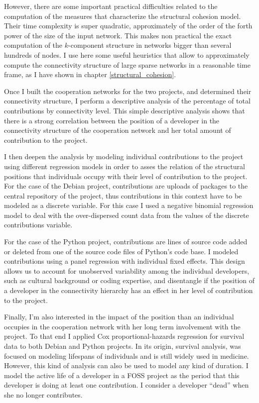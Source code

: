 However, there are some important practical difficulties related to the computation of the measures that characterize the structural cohesion model. Their time complexity is super quadratic, approximately of the order of the forth power of the size of the input network. This makes non practical the exact computation of the $k$-component structure in networks bigger than several hundreds of nodes. I use here some useful heuristics that allow to approximately compute the connectivity structure of large sparse networks in a reasonable time frame, as I have shown in chapter \ref{structural_cohesion}.

Once I built the cooperation networks for the two projects, and determined their connectivity structure, I perform a descriptive analysis of the percentage of total contributions by connectivity level. This simple descriptive analysis shows that there is a strong correlation between the position of a developer in the connectivity structure of the cooperation network and her total amount of contribution to the project.

I then deepen the analysis by modeling individual contributions to the project using different regression models in order to asses the relation of the structural positions that individuals occupy with their level of contribution to the project. For the case of the Debian project, contributions are uploads of packages to the central repository of the project, thus contributions in this context have to be modeled as a discrete variable. For this case I used a negative binomial regression model to deal with the over-dispersed count data from the values of the discrete contributions variable.

For the case of the Python project, contributions are lines of source code added or deleted from one of the source code files of Python's code base. I modeled contributions using a panel regression with individual fixed effects. This design allows us to account for unobserved variability among the individual developers, such as cultural background or coding expertise, and disentangle if the position of a developer in the connectivity hierarchy has an effect in her level of contribution to the project.

Finally, I'm also interested in the impact of the position than an individual occupies in the cooperation network with her long term involvement with the project. To that end I applied Cox proportional-hazards regression for survival data to both Debian and Python projects. In its origin, survival analysis, was focused on modeling lifespans of individuals and is still widely used in medicine. However, this kind of analysis can also be used to model any kind of duration. I model the active life of a developer in a FOSS project as the period that this developer is doing at least one contribution. I consider a developer ``dead'' when she no longer contributes.

